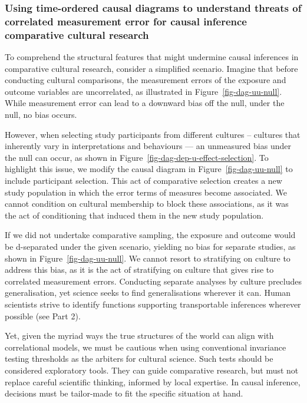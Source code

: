 \documentclass[
  singlecolumn]{article}
\begin{document}
\hypertarget{using-time-ordered-causal-diagrams-to-understand-threats-of-correlated-measurement-error-for-causal-inference-comparative-cultural-research}{%
\subsubsection{Using time-ordered causal diagrams to understand threats
of correlated measurement error for causal inference comparative
cultural
research}\label{using-time-ordered-causal-diagrams-to-understand-threats-of-correlated-measurement-error-for-causal-inference-comparative-cultural-research}}

To comprehend the structural features that might undermine causal
inferences in comparative cultural research, consider a simplified
scenario. Imagine that before conducting cultural comparisons, the
measurement errors of the exposure and outcome variables are
uncorrelated, as illustrated in Figure~\ref{fig-dag-uu-null}. While
measurement error can lead to a downward bias off the null, under the
null, no bias occurs.

However, when selecting study participants from different cultures --
cultures that inherently vary in interpretations and behaviours --- an
unmeasured bias under the null can occur, as shown in
Figure~\ref{fig-dag-dep-u-effect-selection}. To highlight this issue, we
modify the causal diagram in Figure~\ref{fig-dag-uu-null} to include
participant selection. This act of comparative selection creates a new
study population in which the error terms of measures become associated.
We cannot condition on cultural membership to block these associations,
as it was the act of conditioning that induced them in the new study
population.

If we did not undertake comparative sampling, the exposure and outcome
would be d-separated under the given scenario, yielding no bias for
separate studies, as shown in Figure~\ref{fig-dag-uu-null}. We cannot
resort to stratifying on culture to address this bias, as it is the act
of stratifying on culture that gives rise to correlated measurement
errors. Conducting separate analyses by culture precludes
generalisation, yet science seeks to find generalisations wherever it
can. Human scientists strive to identify functions supporting
transportable inferences wherever possible (see Part 2).

Yet, given the myriad ways the true structures of the world can align
with correlational models, we must be cautious when using conventional
invariance testing thresholds as the arbiters for cultural science. Such
tests should be considered exploratory tools. They can guide comparative
research, but must not replace careful scientific thinking, informed by
local expertise. In causal inference, decisions must be tailor-made to
fit the specific situation at hand.
\end{document}
